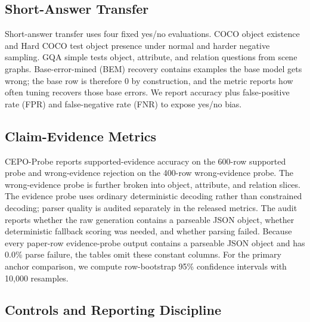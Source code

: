 \documentclass[10pt,twocolumn,letterpaper]{article}
\newcommand{\benchmark}{CEPO-Probe}
\begin{document}
\subsection{Short-Answer Transfer}

Short-answer transfer uses four fixed yes/no evaluations. COCO object
existence and Hard COCO test object presence under normal and harder negative
sampling. GQA simple tests object, attribute, and relation questions from scene
graphs. Base-error-mined (BEM) recovery contains examples the base model gets
wrong; the base row is therefore 0 by construction, and the metric reports how
often tuning recovers those base errors. We report accuracy plus false-positive
rate (FPR) and false-negative rate (FNR) to expose yes/no bias.

\subsection{Claim-Evidence Metrics}

\benchmark{} reports supported-evidence accuracy on the 600-row supported
probe and wrong-evidence rejection on the 400-row wrong-evidence probe. The
wrong-evidence probe is further broken into object, attribute, and relation
slices. The evidence probe uses ordinary deterministic decoding rather than
constrained decoding; parser quality is audited separately in the released
metrics. The audit reports whether the raw generation contains a parseable JSON
object, whether deterministic fallback scoring was needed, and whether parsing
failed. Because every paper-row evidence-probe output contains a parseable JSON
object and has 0.0\% parse failure, the tables omit these constant columns. For
the primary anchor comparison, we compute row-bootstrap 95\% confidence
intervals with 10{,}000 resamples.

\subsection{Controls and Reporting Discipline}
\end{document}

